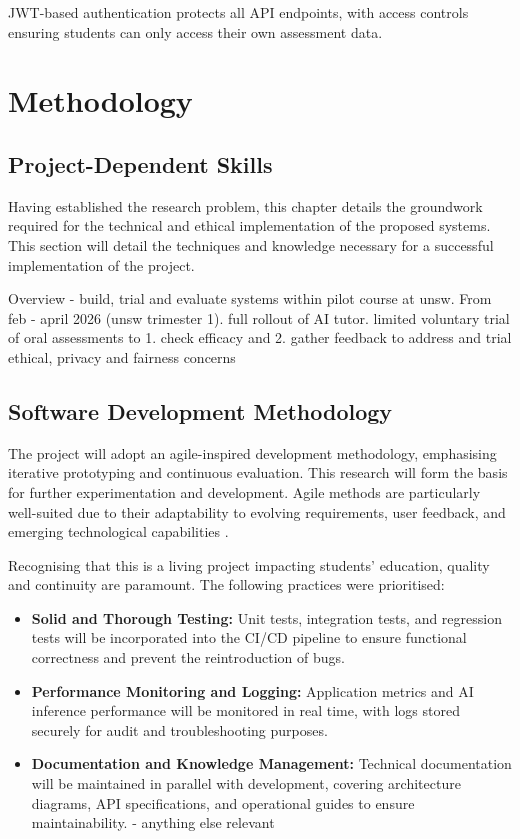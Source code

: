 JWT-based authentication protects all API endpoints, with access controls ensuring students can only access their own assessment data.

\chapter{Methodology}\label{ch:methodology}

\section{Project-Dependent Skills}

Having established the research problem, this chapter details the groundwork required for the technical and ethical implementation of the proposed systems. This section will detail the techniques and knowledge necessary for a successful implementation of the project. 

Overview - build, trial and evaluate systems within pilot course at unsw. From feb - april 2026 (unsw trimester 1). full rollout of AI tutor. limited voluntary trial of oral assessments to 1. check efficacy and 2. gather feedback to address and trial ethical, privacy and fairness concerns

\section{Software Development Methodology}

The project will adopt an agile-inspired development methodology, emphasising iterative prototyping and continuous evaluation. This research will form the basis for further experimentation and development. Agile methods are particularly well-suited due to their adaptability to evolving requirements, user feedback, and emerging technological capabilities \cite{KentBeck2001, DeLucia2010}.

Recognising that this is a living project impacting students' education, quality and continuity are paramount. The following practices were prioritised:

\begin{itemize}
    \item \textbf{Solid and Thorough Testing:} Unit tests, integration tests, and regression tests will be incorporated into the CI/CD pipeline to ensure functional correctness and prevent the reintroduction of bugs.
    \item \textbf{Performance Monitoring and Logging:} Application metrics and AI inference performance will be monitored in real time, with logs stored securely for audit and troubleshooting purposes.
    \item \textbf{Documentation and Knowledge Management:} Technical documentation will be maintained in parallel with development, covering architecture diagrams, API specifications, and operational guides to ensure maintainability.
    - anything else relevant
\end{itemize}

